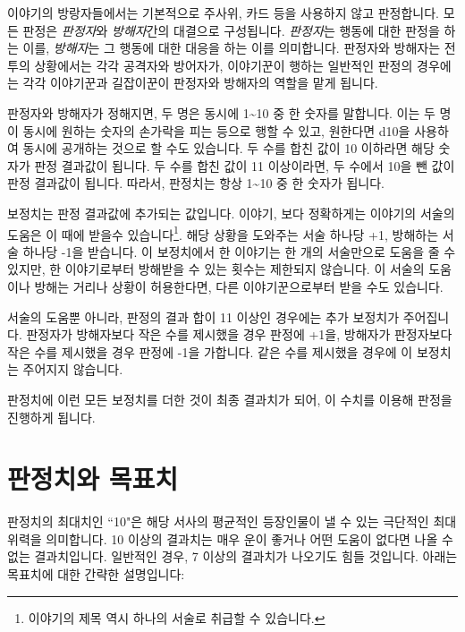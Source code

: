 \documentclass{report}
\begin{document}
	이야기의 방랑자들에서는 기본적으로 주사위, 카드 등을 사용하지 않고 판정합니다. 모든 판정은 \emph{판정자}와 \emph{방해자}간의 대결으로 구성됩니다. \emph{판정자}는 행동에 대한 판정을 하는 이를, \emph{방해자}는 그 행동에 대한 대응을 하는 이를 의미합니다. 판정자와 방해자는 전투의 상황에서는 각각 공격자와 방어자가, 이야기꾼이 행하는 일반적인 판정의 경우에는 각각 이야기꾼과 길잡이꾼이 판정자와 방해자의 역할을 맡게 됩니다.
	
	판정자와 방해자가 정해지면, 두 명은 동시에 1\textasciitilde10 중 한 숫자를 말합니다. 이는 두 명이 동시에 원하는 숫자의 손가락을 피는 등으로 행할 수 있고, 원한다면 d10을 사용하여 동시에 공개하는 것으로 할 수도 있습니다. 두 수를 합친 값이 10 이하라면 해당 숫자가 판정 결과값이 됩니다. 두 수를 합친 값이 11 이상이라면, 두 수에서 10을 뺀 값이 판정 결과값이 됩니다. 따라서, 판정치는 항상 1\textasciitilde10 중 한 숫자가 됩니다.
	
	보정치는 판정 결과값에 추가되는 값입니다. 이야기, 보다 정확하게는 이야기의 서술의 도움은 이 때에 받을수 있습니다\footnote{이야기의 제목 역시 하나의 서술로 취급할 수 있습니다.}. 해당 상황을 도와주는 서술 하나당 +1, 방해하는 서술 하나당 -1을 받습니다. 이 보정치에서 한 이야기는 한 개의 서술만으로 도움을 줄 수 있지만, 한 이야기로부터 방해받을 수 있는 횟수는 제한되지 않습니다. 이 서술의 도움이나 방해는 거리나 상황이 허용한다면, 다른 이야기꾼으로부터 받을 수도 있습니다.
	
	서술의 도움뿐 아니라, 판정의 결과 합이 11 이상인 경우에는 추가 보정치가 주어집니다. 판정자가 방해자보다 작은 수를 제시했을 경우 판정에 +1을, 방해자가 판정자보다 작은 수를 제시했을 경우 판정에 -1을 가합니다. 같은 수를 제시했을 경우에 이 보정치는 주어지지 않습니다.
	
	판정치에 이런 모든 보정치를 더한 것이 최종 결과치가 되어, 이 수치를 이용해 판정을 진행하게 됩니다.
	
	\section*{판정치와 목표치}
	판정치의 최대치인 ``10"은 해당 서사의 평균적인 등장인물이 낼 수 있는 극단적인 최대 위력을 의미합니다. 10 이상의 결과치는 매우 운이 좋거나 어떤 도움이 없다면 나올 수 없는 결과치입니다. 일반적인 경우, 7 이상의 결과치가 나오기도 힘들 것입니다. 아래는 목표치에 대한 간략한 설명입니다:
	
\end{document}
